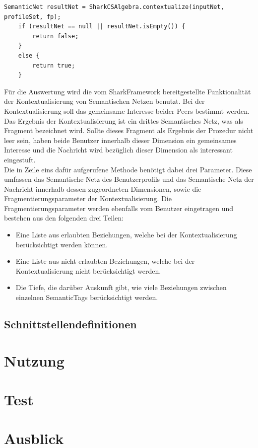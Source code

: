 \begin{lstlisting}
SemanticNet resultNet = SharkCSAlgebra.contextualize(inputNet, profileSet, fp);
	if (resultNet == null || resultNet.isEmpty()) {
		return false;
	}
	else {
		return true;
	}
\end{lstlisting}
Für die Auswertung wird die vom SharkFramework bereitgestellte Funktionalität der Kontextualisierung von Semantischen Netzen benutzt. Bei der Kontextualisierung soll das gemeinsame Interesse beider Peers bestimmt werden. Das Ergebnis der Kontextualisierung ist ein drittes Semantisches Netz, was als Fragment bezeichnet wird. Sollte dieses Fragment als Ergebnis der Prozedur nicht leer sein, haben beide Benutzer innerhalb dieser Dimension ein gemeinsames Interesse und die Nachricht wird bezüglich dieser Dimension als interessant eingestuft.
\\Die in Zeile eins dafür aufgerufene Methode benötigt dabei drei Parameter. Diese umfassen das Semantische Netz des Benutzerprofils und das Semantische Netz der Nachricht innerhalb dessen zugeordneten Dimensionen, sowie die Fragmentierungsparameter der Kontextualisierung. Die Fragmentierungsparameter werden ebenfalls vom Benutzer eingetragen und bestehen aus den folgenden drei Teilen:
\begin{itemize}
	\item Eine Liste aus erlaubten Beziehungen, welche bei der Kontextualisierung berücksichtigt werden können.
	\item Eine Liste aus nicht erlaubten Beziehungen, welche bei der Kontextualisierung nicht berücksichtigt werden.
	\item Die Tiefe, die darüber Auskunft gibt, wie viele Beziehungen zwischen einzelnen SemanticTags berücksichtigt werden.
\end{itemize}

 



\subsection{Schnittstellendefinitionen}\label{ch:filterinterfaces}


\section{Nutzung}


\section{Test}



\section{Ausblick}

